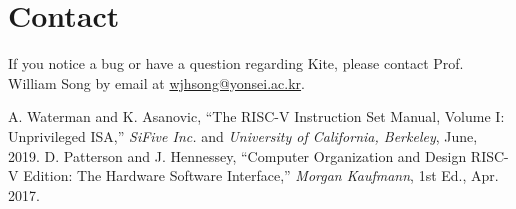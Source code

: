 \documentclass[10pt]{article}
\begin{document}
\section{Contact} \label{sec:contact}
If you notice a bug or have a question regarding Kite, please contact Prof. William Song by email at \href{mailto:wjhsong@yonsei.ac.kr}{wjhsong@yonsei.ac.kr}.


\begin{thebibliography}{2}
    A. Waterman and K. Asanovic, 
    ``The RISC-V Instruction Set Manual, Volume I: Unprivileged ISA,''
    \emph{SiFive Inc.} and \emph{University of California, Berkeley},
    June, 2019.
    D. Patterson and J. Hennessey,
    ``Computer Organization and Design RISC-V Edition: The Hardware Software Interface,''
    \emph{Morgan Kaufmann}, 1st Ed.,
    Apr. 2017.
\end{thebibliography}
\end{document}
